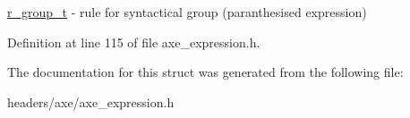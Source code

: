 \hyperlink{structaxe_1_1r__group__t}{r\+\_\+group\+\_\+t} -\/ rule for syntactical group (paranthesised expression) 

Definition at line 115 of file axe\+\_\+expression.\+h.



The documentation for this struct was generated from the following file\+:\begin{DoxyCompactItemize}
\item 
headers/axe/axe\+\_\+expression.\+h\end{DoxyCompactItemize}
